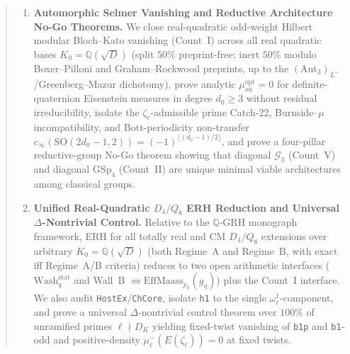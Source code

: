 \documentclass[10pt,reqno]{amsart}
\numberwithin{equation}{section}
\theoremstyle{tightplain}
\theoremstyle{tightdef}
\newcommand{\QQ}{\mathbb{Q}}
\newcommand{\GSp}{\mathrm{GSp}}
\newcommand{\SO}{\mathrm{SO}}
\newcommand{\an}{\mathrm{an}}
\begin{document}
\begin{abstract}
\begin{enumerate}[label=\textup{(\arabic*)}]
\item \textbf{Automorphic Selmer Vanishing and Reductive Architecture No-Go Theorems.} We close real-quadratic odd-weight Hilbert modular Bloch--Kato vanishing (Count~I) across all real quadratic bases $K_0 = \QQ(\sqrt{D})$ (split $50\%$ preprint-free; inert $50\%$ modulo Boxer--Pilloni and Graham--Rockwood preprints, up to the $(\mathrm{Aut}_3)_{L^+}$/Greenberg--Mazur dichotomy), prove analytic $\mu_{\an}^{\mathrm{opt}} = 0$ for definite-quaternion Eisenstein measures in degree $d_0 \ge 3$ without residual irreducibility, isolate the $\zeta_\ell$-admissible prime Catch-22, Burnside--$\mu$ incompatibility, and Bott-periodicity non-transfer $c_\infty(\SO(2d_0-1,2)) = (-1)^{\lfloor (d_0-1)/2 \rfloor}$, and prove a four-pillar reductive-group No-Go theorem showing that diagonal $\mathcal{G}_3$ (Count~V) and diagonal $\GSp_4$ (Count~II) are unique minimal viable architectures among classical groups.

\item \textbf{Unified Real-Quadratic $D_4/Q_8$ ERH Reduction and Universal $\Delta$-Nontrivial Control.} Relative to the $\QQ$-GRH monograph framework, ERH for all totally real and CM $D_4/Q_8$ extensions over arbitrary $K_0 = \QQ(\sqrt{D})$ (both Regime~A and Regime~B, with exact iff Regime~A/B criteria) reduces to two open arithmetic interfaces ($\mathrm{Wash}_q^{\mathrm{stat}}$ and Wall~B $\iff \mathrm{EffMaass}_{p_0}(g_\eta)$) plus the Count~I interface. We also audit \texttt{HostEx}/\texttt{ChCore}, isolate \texttt{h1} to the single $\omega_\ell^1$-component, and prove a universal $\Delta$-nontrivial control theorem over $100\%$ of unramified primes $\ell \nmid D_K$ yielding fixed-twist vanishing of \texttt{b1p} and \texttt{b1}-odd and positive-density $\mu_\ell^-(E(\zeta_\ell)) = 0$ at fixed twists.
\end{enumerate}
\end{abstract}

\maketitle
\tableofcontents








\end{document}
